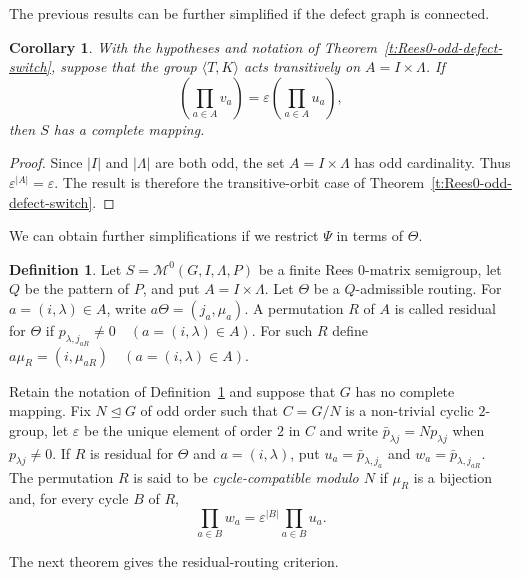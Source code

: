 \documentclass[11pt]{article}
\theoremstyle{plain}
\newtheorem{cor}[theorem]{Corollary}
\theoremstyle{remark}
\theoremstyle{definition}
\newtheorem{definition}[theorem]{Definition}
\theoremstyle{plain}
\begin{document}
The previous results can be further simplified if the defect graph is connected.

\begin{cor}\label{c:Rees0-odd-connected-defect}
With the hypotheses and notation of Theorem~\ref{t:Rees0-odd-defect-switch},
suppose that the group $\langle T,K\rangle$
acts transitively on $A=I\times\Lambda$.
If
\[
        \left(\prod_{a\in A} v_a\right)
        =
        \varepsilon
        \left(\prod_{a\in A} u_a\right),
\]
then $S$ has a complete mapping.
\end{cor}

\begin{proof}
Since $|I|$ and $|\Lambda|$ are both odd, the set $A=I\times\Lambda$ has odd
cardinality. Thus
\(\varepsilon^{|A|}=\varepsilon.\)
The result is therefore the transitive-orbit case of
Theorem~\ref{t:Rees0-odd-defect-switch}.
\end{proof}

We can obtain further simplifications if we restrict $\Psi$ in terms of $\Theta$.

\begin{definition}\label{d:Rees0-general-residual-routing}
Let
\(S=\mathcal M^0(G,I,\Lambda,P)\)
be a finite Rees $0$-matrix semigroup, let $Q$ be the pattern of $P$, and put
$A=I\times\Lambda$. Let $\Theta$ be a $Q$-admissible routing. For
$a=(i,\lambda)\in A$, write
\(a\Theta=(j_a,\mu_a).\)
A permutation $R$ of $A$ is called residual for $\Theta$ if
\(p_{\lambda,j_{aR}}\ne0 \quad(a=(i,\lambda)\in A).\)
For such $R$ define
\(a\mu_R=(i,\mu_{aR}) \quad(a=(i,\lambda)\in A).\)
\end{definition}

\begingroup
Retain the notation of Definition~\ref{d:Rees0-general-residual-routing}
and suppose that $G$ has no complete mapping. Fix $N\unlhd G$ of odd order
such that $C=G/N$ is a non-trivial cyclic $2$-group, let $\varepsilon$ be
the unique element of order $2$ in $C$ and write
$\bar p_{\lambda j}=Np_{\lambda j}$ when $p_{\lambda j}\ne0$. If $R$ is
residual for $\Theta$ and $a=(i,\lambda)$, put
$u_a=\bar p_{\lambda,j_a}$ and $w_a=\bar p_{\lambda,j_{aR}}$. The
permutation $R$ is said to be \emph{cycle-compatible modulo $N$} if
$\mu_R$ is a bijection and, for every cycle $B$ of $R$,
\begin{equation}\label{eq:general-residual-cycle-condition}
        \prod_{a\in B}w_a
        =
        \varepsilon^{|B|}\prod_{a\in B}u_a.
\end{equation}

The next theorem gives the residual-routing criterion.
\end{document}
